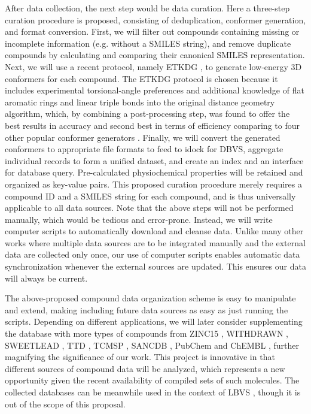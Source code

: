 \documentclass[a4paper,12pt]{article}
\begin{document}
After data collection, the next step would be data curation. Here a three-step curation procedure is proposed, consisting of deduplication, conformer generation, and format conversion. First, we will filter out compounds containing missing or incomplete information (e.g. without a SMILES string), and remove duplicate compounds by calculating and comparing their canonical SMILES representation. Next, we will use a recent protocol, namely ETKDG \citep{1697}, to generate low-energy 3D conformers for each compound. The ETKDG protocol is chosen because it includes experimental torsional-angle preferences and additional knowledge of flat aromatic rings and linear triple bonds into the original distance geometry algorithm, which, by combining a post-processing step, was found to offer the best results in accuracy and second best in terms of efficiency comparing to four other popular conformer generators \citep{1127}. Finally, we will convert the generated conformers to appropriate file formats to feed to idock for DBVS, aggregate individual records to form a unified dataset, and create an index and an interface for database query. Pre-calculated physiochemical properties will be retained and organized as key-value pairs. This proposed curation procedure merely requires a compound ID and a SMILES string for each compound, and is thus universally applicable to all data sources. Note that the above steps will not be performed manually, which would be tedious and error-prone. Instead, we will write computer scripts to automatically download and cleanse data. Unlike many other works where multiple data sources are to be integrated manually and the external data are collected only once, our use of computer scripts enables automatic data synchronization whenever the external sources are updated. This ensures our data will always be current.

The above-proposed compound data organization scheme is easy to manipulate and extend, making including future data sources as easy as just running the scripts. Depending on different applications, we will later consider supplementing the database with more types of compounds from ZINC15 \citep{1688}, WITHDRAWN \citep{1718}, SWEETLEAD \citep{1511}, TTD \citep{1790}, TCMSP \citep{1375}, SANCDB \citep{1680}, PubChem \citep{1701} and ChEMBL \citep{1424}, further magnifying the significance of our work. This project is innovative in that different sources of compound data will be analyzed, which represents a new opportunity given the recent availability of compiled sets of such molecules. The collected databases can be meanwhile used in the context of LBVS \citep{1749}, though it is out of the scope of this proposal.
\end{document}
